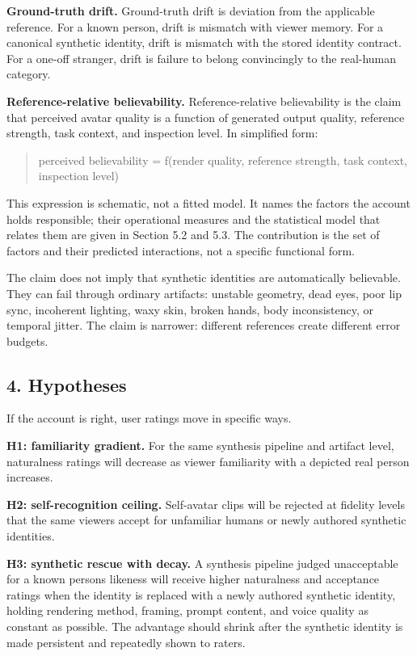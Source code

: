 \documentclass[
]{article}
\begin{document}
\textbf{Ground-truth drift.} Ground-truth drift is deviation from the
applicable reference. For a known person, drift is mismatch with viewer
memory. For a canonical synthetic identity, drift is mismatch with the
stored identity contract. For a one-off stranger, drift is failure to
belong convincingly to the real-human category.

\textbf{Reference-relative believability.} Reference-relative
believability is the claim that perceived avatar quality is a function
of generated output quality, reference strength, task context, and
inspection level. In simplified form:

\begin{quote}
perceived believability = f(render quality, reference strength, task
context, inspection level)
\end{quote}

This expression is schematic, not a fitted model. It names the factors
the account holds responsible; their operational measures and the
statistical model that relates them are given in Section 5.2 and 5.3.
The contribution is the set of factors and their predicted interactions,
not a specific functional form.

The claim does not imply that synthetic identities are automatically
believable. They can fail through ordinary artifacts: unstable geometry,
dead eyes, poor lip sync, incoherent lighting, waxy skin, broken hands,
body inconsistency, or temporal jitter. The claim is narrower: different
references create different error budgets.

\subsection{4. Hypotheses}\label{4-hypotheses}

If the account is right, user ratings move in specific ways.

\textbf{H1: familiarity gradient.} For the same synthesis pipeline and
artifact level, naturalness ratings will decrease as viewer familiarity
with a depicted real person increases.

\textbf{H2: self-recognition ceiling.} Self-avatar clips will be
rejected at fidelity levels that the same viewers accept for unfamiliar
humans or newly authored synthetic identities.

\textbf{H3: synthetic rescue with decay.} A synthesis pipeline judged
unacceptable for a known person\textquotesingle s likeness will receive
higher naturalness and acceptance ratings when the identity is replaced
with a newly authored synthetic identity, holding rendering method,
framing, prompt content, and voice quality as constant as possible. The
advantage should shrink after the synthetic identity is made persistent
and repeatedly shown to raters.
\end{document}
